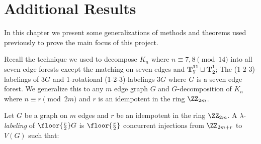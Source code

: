 \chapter{Additional Results}
In this chapter we present some generalizations of methods and theorems used previously to prove the main focus of this project.

Recall the technique we used to decompose $K_{n}$ where $n\equiv 7,8 \pmod{14}$ into all seven edge forests except the matching on seven edges and $\mathbf{T_{7}^{11}\sqcup T_{2}^{1}}$; The (1-2-3)-labelings of $3G$ and 1-rotational (1-2-3)-labelings $3G$ where $G$ is a seven edge forest. We generalize this to any $m$ edge graph $G$ and $G$-decomposition of $K_{n}$ where $n\equiv r\pmod{2m}$ and $r$ is an idempotent in the ring $\ZZ_{2m}$.

\begin{definition}
Let $G$ be a graph on $m$ edges and $r$ be an idempotent in the ring $\ZZ_{2m}$. A $\lambda$-\textit{labeling} of $\floor{\frac{r}{2}}G$ is $\floor{\frac{r}{2}}$ concurrent injections from $\ZZ_{2m+r}$ to $V(G)$ such that:
\end{definition}



